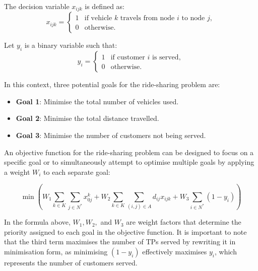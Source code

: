 The decision variable \( x_{ijk} \) is defined as:
\[
x_{ijk} =
\begin{cases} 
1 & \text{if vehicle } k \text{ travels from node } i \text{ to node } j, \\
0 & \text{otherwise.}
\end{cases}
\]

Let \( y_i \) is a binary variable such that:
\[
y_i =
\begin{cases} 
1 & \text{if customer } i \text{ is served}, \\
0 & \text{otherwise.}
\end{cases}
\]

In this context, three potential goals for the ride-sharing problem are:

\begin{itemize}
    \item \textbf{Goal 1}: Minimise the total number of vehicles used.
    \item \textbf{Goal 2}: Minimise the total distance travelled.
    \item \textbf{Goal 3}: Minimise the number of customers not being served.
\end{itemize}

An objective function for the ride-sharing problem can be designed to focus on a specific goal or to simultaneously attempt to optimise multiple goals by applying a weight \( W_i \) to each separate goal:

\[
\min \left( W_1 \sum_{k \in K} \sum_{j \in N^*} x_{0j}^k + W_2 \sum_{k \in K} \sum_{(i, j) \in A} d_{ij} x_{ijk} + W_3 \sum_{i \in N^*} (1 - y_i) \right)
\]

In the formula above, \( W_1, W_2, \) and \( W_3 \) are weight factors that determine the priority assigned to each goal in the objective function. It is important to note that the third term maximises the number of TPs served by rewriting it in minimisation form, as minimising \( (1 - y_i) \) effectively maximises \( y_i \), which represents the number of customers served.

